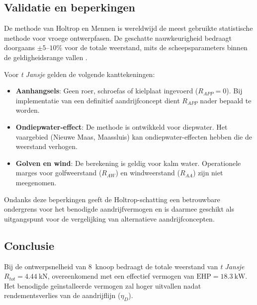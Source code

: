 \subsection{Validatie en beperkingen}

De methode van Holtrop en Mennen is wereldwijd de meest gebruikte statistische methode voor vroege ontwerpfasen. De geschatte nauwkeurigheid bedraagt doorgaans $\pm 5$--$10\%$ voor de totale weerstand, mits de scheepsparameters binnen de geldigheidsrange vallen \cite{Holtrop1984, Molland2011}.

Voor \emph{t Jansje} gelden de volgende kanttekeningen:

\begin{itemize}
    \item \textbf{Aanhangsels}: Geen roer, schroefas of kielplaat ingevoerd ($R_{APP} = 0$). Bij implementatie van een definitief aandrijfconcept dient $R_{APP}$ nader bepaald te worden.
    \item \textbf{Ondiepwater-effect}: De methode is ontwikkeld voor diepwater. Het vaargebied (Nieuwe Maas, Maassluis) kan ondiepwater-effecten hebben die de weerstand verhogen.
    \item \textbf{Golven en wind}: De berekening is geldig voor kalm water. Operationele marges voor golfweerstand ($R_{AW}$) en windweerstand ($R_{AA}$) zijn niet meegenomen.
\end{itemize}

Ondanks deze beperkingen geeft de Holtrop-schatting een betrouwbare ondergrens voor het benodigde aandrijfvermogen en is daarmee geschikt als uitgangspunt voor de vergelijking van alternatieve aandrijfconcepten.

\subsection*{Conclusie}

Bij de ontwerpsnelheid van 8~knoop bedraagt de totale weerstand van \emph{t Jansje} $R_{tot} = 4.44\ \mathrm{kN}$, overeenkomend met een effectief vermogen van $\mathrm{EHP} = 18.3\ \mathrm{kW}$. Het benodigde geïnstalleerde vermogen zal hoger uitvallen nadat rendementsverlies van de aandrijflijn ($\eta_D$).